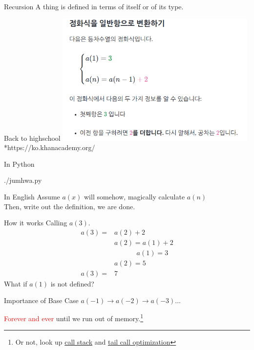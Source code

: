 \documentclass{beamer}
\begin{document}
\begin{frame}{Recursion}
  A thing is defined in terms of itself or of its type.
\end{frame}

\begin{frame}{Back to highschool}
  \includegraphics[width=100mm]{./jumhwasik.png}\\
  *\tiny{https://ko.khanacademy.org/}
  
\end{frame}

\begin{frame}[fragile]{In Python}
  \begin{lstinputlisting}
    {./jumhwa.py}
  \end{lstinputlisting}
\end{frame}

\begin{frame}{In English}
  Assume $a(x)$ will somehow, magically calculate $a(n)$\\
  Then, write out the definition, we are done.
\end{frame}

\begin{frame}{How it works}
  Calling $a(3)$.
  \begin{align*}
a(3) = &a(2) + 2\\
&a(2) = a(1) + 2\\
    &\phantom{{ab}={ab}} a(1) = 3\\
    &a(2) = 5\\
a(3) = &7
  \end{align*}
  What if $a(1)$ is not defined?\\
\end{frame}

\begin{frame}{Importance of Base Case}
  $a(-1) \rightarrow a(-2) \rightarrow a(-3) ...$


  \textcolor{red}{Forever and ever}
  until we run out of memory.\footnote{Or not, look up
  \href{https://www.google.com/search?q=call+stack}{call stack} and
  \href{https://www.google.com/search?q=tail+call+optimization}{tail call
  optimization}}
\end{frame}
\end{document}
